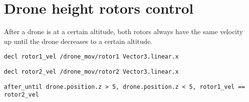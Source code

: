 \section{Drone height rotors control}

After a drone is at a certain altitude, both rotors always have the same velocity up until the drone decreases to a certain altitude.


\texttt{decl rotor1\_vel /drone\_mov/rotor1 Vector3.linear.x}

\texttt{decl rotor2\_vel /drone\_mov/rotor2 Vector3.linear.x}


\texttt{after\_until drone.position.z > 5, drone.position.z < 5, rotor1\_vel == rotor2\_vel}

